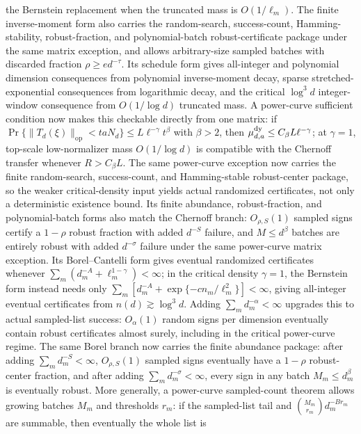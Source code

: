 \documentclass[11pt]{article}
\begin{document}
the Bernstein replacement when the truncated mass is \(O(1/\ell_m)\).  The finite inverse-moment
form also carries the
random-search, success-count, Hamming-stability, robust-fraction, and
polynomial-batch robust-certificate package under the same matrix exception, and
allows arbitrary-size sampled batches with discarded fraction
\(\rho\ge e d^{-\tau}\).
Its schedule form
gives all-integer and polynomial
dimension consequences from polynomial inverse-moment decay, sparse
stretched-exponential consequences from logarithmic decay, and the critical
\(\log^3d\) integer-window consequence from \(O(1/\log d)\) truncated mass.
A power-curve
sufficient condition now makes this
checkable directly from one matrix: if
\(\Pr\{\|T_d(\xi)\|_{\mathrm{op}}<t aN_d\}\le L\ell^{-\gamma}t^\beta\) with
\(\beta>2\), then \(\mu_{d,a}^{\rm dy}\le C_\beta L\ell^{-\gamma}\); at
\(\gamma=1\), top-scale low-normalizer mass \(O(1/\log d)\) is compatible with
the Chernoff transfer whenever \(R>C_\beta L\).  The same power-curve exception
now carries the finite random-search, success-count, and Hamming-stable
robust-center package, so the weaker critical-density input yields actual
randomized certificates, not only a deterministic existence bound.  Its finite
abundance, robust-fraction, and polynomial-batch forms also match the Chernoff
branch: \(O_{\rho,S}(1)\) sampled signs certify a \(1-\rho\) robust fraction
with added \(d^{-S}\) failure, and \(M\le d^\beta\) batches are entirely robust
with added \(d^{-\sigma}\) failure under the same power-curve matrix exception.
Its
Borel--Cantelli form gives eventual randomized certificates whenever
\(\sum_m(d_m^{-A}+\ell_m^{1-\gamma})<\infty\); in the critical density
\(\gamma=1\), the Bernstein form instead needs only
\(\sum_m[d_m^{-A}+\exp\{-c n_m/\ell_m^2\}]<\infty\), giving all-integer
eventual certificates from \(n(d)\gtrsim\log^3 d\).  Adding
\(\sum_m d_m^{-\alpha}<\infty\) upgrades this to actual sampled-list success:
\(O_\alpha(1)\) random signs per dimension eventually contain robust
certificates almost surely, including in the critical power-curve regime.  The
same Borel branch now carries the finite abundance package: after adding
\(\sum_m d_m^{-S}<\infty\), \(O_{\rho,S}(1)\) sampled signs eventually have a
\(1-\rho\) robust-center fraction, and after adding
\(\sum_m d_m^{-\sigma}<\infty\), every sign in any batch \(M_m\le d_m^\beta\)
is eventually robust.  More generally, a power-curve sampled-count theorem allows
growing batches \(M_m\) and thresholds \(r_m\): if the sampled-list tail and
\(\binom{M_m}{r_m}d_m^{-B r_m}\) are summable, then eventually the whole list is
\end{document}
